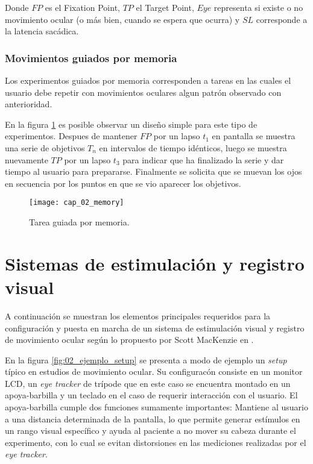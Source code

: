\documentclass[../main.tex]{subfiles}
\begin{document}
				Donde $FP$ es el Fixation Point, $TP$ el Target Point, $Eye$ representa si existe o no movimiento ocular (o más bien, cuando se espera que ocurra) y $SL$ corresponde a la latencia sacádica.  

			\vspace{-5mm}
			\subsubsection{Movimientos guiados por memoria}
			\label{ssub:movimientos_pro_anti_sacadicos}
				Los experimentos guiados por memoria corresponden a tareas en las cuales el usuario debe repetir con movimientos oculares algun patrón observado con anterioridad. 

				En la figura \ref{fig:02_memory} es posible observar un diseño simple para este tipo de experimentos. Despues de mantener $FP$ por un lapso $t_1$ en pantalla se muestra una serie de objetivos $T_n$ en intervalos de tiempo idénticos, luego se muestra nuevamente $TP$ por un lapso $t_3$ para indicar que ha finalizado la serie y dar tiempo al usuario para prepararse. Finalmente se solicita que se muevan los ojos en secuencia por los puntos en que se vio aparecer los objetivos.
				\begin{figure}[H]
					\centering
					\texttt{[image: cap\_02\_memory]}
					\caption{Tarea guiada por memoria.}
					\label{fig:02_memory}
				\end{figure} 
	
	\section{Sistemas de estimulación y registro visual}
	\label{sec:02_sistemas_de_estimulacion_registro_visual}
		A continuación se muestran los elementos principales requeridos para la configuración y puesta en marcha de un sistema de estimulación visual y registro de movimiento ocular según lo propuesto por Scott MacKenzie en \cite{article:baseInfo}. 

		En la figura \ref{fig:02_ejemplo_setup} se presenta a modo de ejemplo un \textit{setup} típico en estudios de movimiento ocular. Su configuracón consiste en un monitor LCD, un \textit{eye tracker} de trípode que en este caso se encuentra montado en un apoya-barbilla y un teclado en el caso de requerir interacción con el usuario. El apoya-barbilla cumple dos funciones sumamente importantes: Mantiene al usuario a una distancia determinada de la pantalla, lo que permite generar estímulos en un rango visual específico y ayuda al paciente a no mover su cabeza durante el experimento, con lo cual se evitan distorsiones en las mediciones realizadas por el \textit{eye tracker}.  
\end{document}
